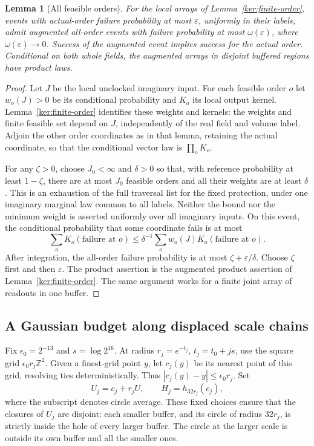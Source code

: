 \documentclass[11pt]{article}
\numberwithin{equation}{section}
\newtheorem{lemma}[theorem]{Lemma}
\theoremstyle{definition}
\theoremstyle{remark}
\newcommand{\1}{\mathbf 1}
\begin{document}
\begin{lemma}[All feasible orders]\label{ann:all-orders}
For the local arrays of Lemma~\ref{ker:finite-order}, events with
actual-order failure probability at most \(\varepsilon\), uniformly
in their labels, admit augmented all-order events with failure
probability at most \(\omega(\varepsilon)\), where
\(\omega(\varepsilon)\to0\).  Success of the augmented event implies
success for the actual order.  Conditional on both whole fields,
the augmented arrays in disjoint buffered regions have product laws.
\end{lemma}

\begin{proof}
Let \(J\) be the local unclocked imaginary input.  For each feasible
order \(o\) let \(w_o(J)>0\) be its conditional probability and
\(K_o\) its local output kernel.  Lemma~\ref{ker:finite-order}
identifies these weights and kernels: the weights and finite feasible
set depend on \(J\), independently of the real field and volume
label.  Adjoin the other order coordinates as in that lemma, retaining
the actual coordinate, so that the conditional vector law is
\(\prod_oK_o\).

For any \(\zeta>0\), choose \(J_0<\infty\) and \(\delta>0\)
so that, with reference probability at least \(1-\zeta\), there
are at most \(J_0\) feasible orders and all their weights are at
least \(\delta\). This is an exhaustion of the full traversal list for
the fixed protection, under one imaginary marginal law common to all labels.
Neither the bound nor the minimum weight is asserted uniformly over
all imaginary inputs.
On this event, the conditional probability that some coordinate
fails is at most
\[
 \sum_oK_o(\text{failure at }o)
 \le\delta^{-1}\sum_ow_o(J)K_o(\text{failure at }o).
\]
After integration, the all-order failure probability is at most
\(\zeta+\varepsilon/\delta\).  Choose \(\zeta\) first and then
\(\varepsilon\).  The product assertion is the augmented product
assertion of Lemma~\ref{ker:finite-order}.  The same argument works
for a finite joint array of readouts in one buffer.
\end{proof}

\subsection{A Gaussian budget along displaced scale chains}

Fix \(\epsilon_0=2^{-13}\) and \(s=\log 2^{16}\).
At radius \(r_j=e^{-t_j}\), \(t_j=t_0+js\), use the square grid
\(\epsilon_0r_j\mathbb Z^2\).
Given a finest-grid point \(y\), let \(c_j(y)\) be its nearest
point of this grid, resolving ties deterministically.
Thus \(|c_j(y)-y|\le\epsilon_0r_j\).
Set
\begin{equation}
 U_j=c_j+r_jU,\qquad
 H_j=h_{32r_j}(c_j),
 \label{ann:coarse-values}
\end{equation}
where the subscript denotes circle average.  These fixed choices
ensure that the closures of \(U_j\) are disjoint: each smaller buffer,
and its circle of radius \(32r_j\), is strictly inside the hole of
every larger buffer.  The circle at the larger scale is outside its
own buffer and all the smaller ones.
\end{document}

